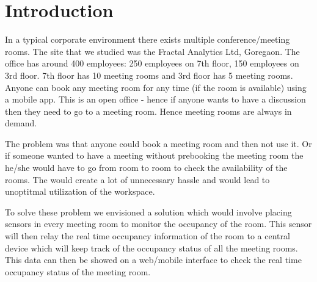 \chapter{Introduction}

In a typical corporate environment there exists multiple conference/meeting rooms.
The site that we studied was the  Fractal Analytics Ltd, Goregaon. The office has around 400 employees: 250 employees on 7th floor, 150 employees on 3rd floor. 7th floor has 10 meeting rooms and 3rd floor has 5 meeting rooms. Anyone can book any meeting room for any time (if the room is available) using a mobile app. This is an open office - hence if anyone wants to have a discussion then they need to go to a meeting room. Hence meeting rooms are always in demand.

\vspace{10pt}

The problem was that anyone could book a meeting room and then not use it. Or if someone wanted to have a meeting without prebooking the meeting room the he/she would have to go from room to room to check the availability of the rooms. The would create a lot of unnecessary hassle and would lead to unoptitmal utilization of the workspace.

\vspace{10pt}

To solve these problem we envisioned a solution which would involve placing sensors in every meeting room to monitor the occupancy of the room. This sensor will then relay the real time occupancy information of the room to a central device which will keep track of the occupancy status of all the meeting rooms. This data can then be showed on a web/mobile interface to check the real time occupancy status of the meeting room.